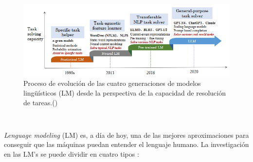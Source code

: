 \begin{figure}[H]
    \begin{center}
      \includegraphics[width=15cm]{figuras/Capitulo_03/EvolutionLM.png}
    \end{center}
    \caption[Proceso de evolución de las cuatro generaciones de modelos lingüísticos (LM) desde la perspectiva de la capacidad de resolución de tareas.]{Proceso de evolución de las cuatro generaciones de modelos lingüísticos (LM) desde la perspectiva de la capacidad de resolución de tareas.(\cite{ZhaoWayneXin2023ASoL})}
    \label{fig:evolutionLM}
\end{figure}\

\textit{Lenguage modeling} (LM) es, a día de hoy, una de las mejores aproximaciones para conseguir
que las máquinas puedan entender el lenguaje humano. La investigación en las LM's se puede dividir
en cuatro tipos \cite{ZhaoWayneXin2023ASoL}:

